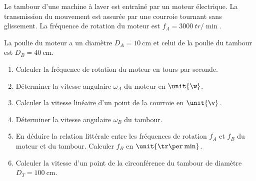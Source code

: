 Le tambour d'une machine à laver est entraîné par un moteur électrique. La
transmission du mouvement est assurée par une courroie tournant sans
glissement. La fréquence de rotation du moteur est
$f_{A}=\qty{3000}{tr\per\min}$.

La poulie du moteur a un diamètre $D_{A}=\qty{10}{\cm}$ et celui de la poulie du
tambour est $D_{B}=\qty{40}{\cm}$.
\begin{figure}[H]
    \centering
    \caption{}
    \label{fig:scie}
\end{figure}
\begin{enumerate}
    \item Calculer la fréquence de rotation du moteur en tours par seconde.
    \item Déterminer la vitesse angulaire $\omega_{A}$ du moteur en $\unit{\w}$.
    \item Calculer la vitesse linéaire d'un point de la courroie en
          $\unit{\v}$.
    \item Déterminer la vitesse angulaire $\omega_{B}$ du tambour.
    \item En déduire la relation littérale entre les fréquences de rotation
          $f_{A}$ et $f_{B}$ du moteur et du tambour. Calculer $f_{B}$ en
          $\unit{\tr\per\min}$.
    \item Calculer la vitesse d'un point de la circonférence du tambour de
          diamètre $D_{T}=\qty{100}{\cm}$.
\end{enumerate}
